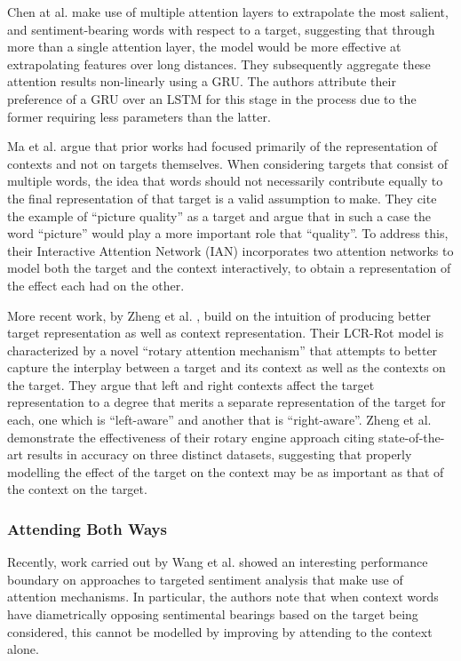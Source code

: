 \documentclass[../../fyp.tex]{subfiles}
\begin{document}
Chen at al. \cite{chen2017} make use of multiple attention layers to extrapolate the most salient, and sentiment-bearing words with respect to a target, suggesting that through more than a single attention layer, the model would be more effective at extrapolating features over long distances. They subsequently aggregate these attention results non-linearly using a GRU. The authors attribute their preference of a GRU over an LSTM for this stage in the process due to the former requiring less parameters than the latter.

Ma et al. \cite{dehongma2017} argue that prior works had focused primarily of the representation of contexts and not on targets themselves. When considering targets that consist of multiple words, the idea that words should not necessarily contribute equally to the final representation of that target is a valid assumption to make. They cite the example of \enquote{picture quality} as a target and argue that in such a case the word \enquote{picture} would play a more important role that \enquote{quality}. To address this, their Interactive Attention Network (IAN) incorporates two attention networks to model both the target and the context interactively, to obtain a representation of the effect each had on the other.

More recent work, by Zheng et al. \cite{zheng2018}, build on the intuition of producing better target representation as well as context representation. Their LCR-Rot model is characterized by a novel \enquote{rotary attention mechanism} that attempts to better capture the interplay between a target and its context as well as the contexts on the target. They argue that left and right contexts affect the target representation to a degree that merits a separate representation of the target for each, one which is \enquote{left-aware} and another that is \enquote{right-aware}. Zheng et al. \cite{zheng2018} demonstrate the effectiveness of their rotary engine approach citing state-of-the-art results in accuracy on three distinct datasets, suggesting that properly modelling the effect of the target on the context may be as important as that of the context on the target.

\subsubsection{Attending Both Ways}
Recently, work carried out by Wang et al. \cite{wang2018} showed an interesting performance boundary on approaches to targeted sentiment analysis that make use of attention mechanisms. In particular, the authors note that when context words have diametrically opposing sentimental bearings based on the target being considered, this cannot be modelled by improving by attending to the context alone.
\end{document}
